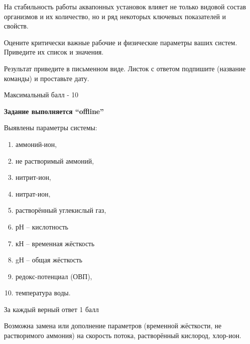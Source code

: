 
На стабильность работы аквапонных установок влияет не только видовой состав организмов и их количество, но и ряд некоторых ключевых показателей и свойств. 
  
Оцените критически важные рабочие и физические параметры ваших систем. Приведите их список и значения. 

Результат приведите в письменном виде. Листок с ответом подпишите (название команды) и проставьте дату.

Максимальный балл - 10

\textbf{Задание выполняется “offline”}

\answerMath

Выявлены параметры системы: 
\begin{enumerate}
    \item аммоний-ион, 
    \item не растворимый аммоний, 
    \item нитрит-ион, 
    \item нитрат-ион, 
    \item растворённый углекислый газ,
    \item рН – кислотность 
    \item кН – временная жёсткость 
    \item gН – общая жёсткость 
    \item редокс-потенциал (ОВП), 
    \item температура воды. 
\end{enumerate}

За каждый верный ответ 1 балл

Возможна замена или дополнение параметров (временной жёсткости, не растворимого аммония) на скорость потока, растворённый кислород, хлор-ион.